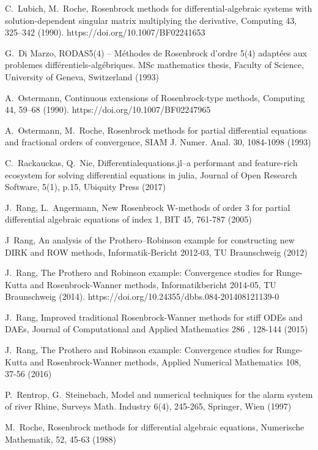 \documentclass{juliacon}
\begin{document}
\begin{thebibliography}{}
 C.~Lubich, M.~Roche, Rosenbrock methods for differential-algebraic systems with solution-dependent singular matrix multiplying the derivative,
Computing 43, 325–342 (1990). https://doi.org/10.1007/BF02241653

 G.~Di Marzo, RODAS5(4) – Méthodes de Rosenbrock d’ordre 5(4) adaptées aux problemes différentiels-algébriques. MSc mathematics thesis, Faculty of Science,
University of Geneva, Switzerland (1993)

 A.~Ostermann, Continuous extensions of Rosenbrock-type methods,  Computing 44, 59–68 (1990). https://doi.org/10.1007/BF02247965

 A.~Ostermann, M.~Roche, Rosenbrock methods for partial differential equations and fractional orders of convergence,
SIAM J. Numer. Anal. 30, 1084-1098 (1993)

 C.~Rackauckas, Q.~Nie, Differentialequations.jl--a performant and feature-rich ecosystem for solving differential equations in julia,
Journal of Open Research Software, 5(1), p.15, Ubiquity Press (2017)

 J.~Rang, L.~Angermann,
New Rosenbrock W-methods of order 3 for partial differential algebraic equations of index 1, BIT 45, 761-787 (2005)

 J~Rang, An analysis of the Prothero–Robinson example for constructing new DIRK and ROW methods, Informatik-Bericht 2012-03, TU Braunschweig (2012)

 J.~Rang, The Prothero and Robinson example: 
Convergence studies for Runge-Kutta and Rosenbrock-Wanner methods, 
Informatikbericht 2014-05, TU Braunschweig (2014).  https://doi.org/10.24355/dbbs.084-201408121139-0

 J.~Rang, Improved traditional Rosenbrock-Wanner methods for stiff ODEs and DAEs,
Journal of Computational and Applied Mathematics 286 , 128-144 (2015)

J.~Rang, The Prothero and Robinson example: Convergence studies for Runge-Kutta and Rosenbrock-Wanner methods,
Applied Numerical Mathematics 108, 37-56 (2016)

 P.~Rentrop, G.~Steinebach,
Model and numerical techniques for the alarm system of river Rhine,
Surveys Math. Industry 6(4), 245-265, Springer, Wien (1997)

 M.~Roche, Rosenbrock methods for differential algebraic equations, Numerische Mathematik, 52, 45-63 (1988)


\end{thebibliography}
\end{document}
